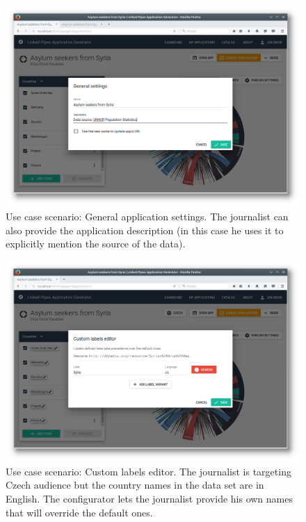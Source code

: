 \begin{figure}
	\centering
	\includegraphics[width=145mm]{img/05_scenario_07_general_settings}
	\caption{Use case scenario: General application settings. The journalist can also provide the application description (in this case he uses it to explicitly mention the source of the data).}
	\label{fig:scenario-07-general-settings}
\end{figure}

\begin{figure}
	\centering
	\includegraphics[width=145mm]{img/05_scenario_08_custom_label_editor}
	\caption{Use case scenario: Custom labels editor. The journalist is targeting Czech audience but the country names in the data set are in English. The configurator lets the journalist provide his own names that will override the default ones. }
	\label{fig:scenario-08-custom-label-editor}
\end{figure}

